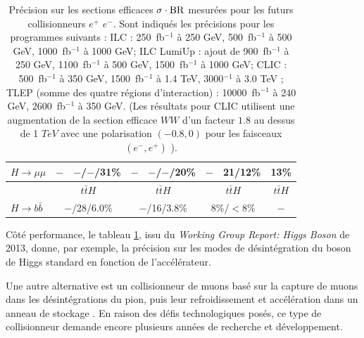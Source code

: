 \begin{table}[htb!]
\begin{center}
\begin{tabular}{l|cc|cc|cc|c}
$H\to \mu\mu$          & $-$            & $-$/$-$/31\%  & $-$            & $-$/$-$/20\%              &  $-$           &  21/12\%    &  13\%        \\
\hline
& \multicolumn{2}{c|}{$t\bar{t}H$} & \multicolumn{2}{c|}{$t\bar{t}H$}        & \multicolumn{2}{c|}{$t\bar{t}H$}         & \multicolumn{1}{c}{$t\bar{t}H$} \\
\hline
$H\to b\bar{b}$        & \multicolumn{2}{c|}{$-$/28/6.0\%} & \multicolumn{2}{c|}{$-$/16/3.8\%}        & \multicolumn{2}{c|}{8\%/$<8$\%}   &  \multicolumn{1}{c}{$-$}  \\
\hline\hline
\end{tabular}
\caption{ \footnotesize{Pr\'ecision sur les sections efficaces $\sigma \cdot {\rm BR}$ mesur\'ees pour les futurs collisionneurs $e^+$ $e^-$. Sont indiqu\'es les pr\'ecisions pour les programmes suivants : ILC : 250~fb$^{-1}$ \`a 250 GeV, 500~fb$^{-1}$ \`a 500 GeV, 1000~fb$^{-1}$ \`a 1000 GeV; ILC LumiUp : ajout de 900~fb$^{-1}$ \`a 250 GeV, 1100~fb$^{-1}$ \`a 500 GeV, 1500~fb$^{-1}$ \`a 1000 GeV; CLIC : 500~fb$^{-1}$ \`a 350 GeV, 1500~fb$^{-1}$ \`a 1.4 TeV, 3000$^{-1}$ \`a 3.0 TeV ; TLEP (somme des quatre r\'egions d'interaction) : 10000~fb$^{-1}$ \`a 240 GeV, 2600~fb$^{-1}$ \`a 350 GeV. (Les r\'esultats pour CLIC utilisent une augmentation de la section efficace $WW$ d'un facteur $1.8$ au dessus de 1 $TeV$ avec une polarisation $(-0.8,0)$ pour les faisceaux $(e^-,e^+)$ \cite{Dawson:2013bba}).} }
\label{tab:fitinputs}
\end{center}
\end{table}
  
  
  Côt\'e performance, le tableau \ref{tab:fitinputs}, issu du \textit{Working Group Report: Higgs Boson} \cite{Dawson:2013bba} de 2013, donne, par exemple, la pr\'ecision sur les modes de d\'esint\'egration du boson de Higgs standard en fonction de l'acc\'el\'erateur.
  
  \medskip
  Une autre alternative est un collisionneur de muons bas\'e sur la capture de muons dans les d\'esint\'egrations du pion, puis leur refroidissement et accélération dans un anneau de stockage \cite{Lipton:2012du}. En raison des d\'efis technologiques pos\'es, ce type de collisionneur demande encore plusieurs ann\'ees de recherche et d\'eveloppement.
  
  \medskip

